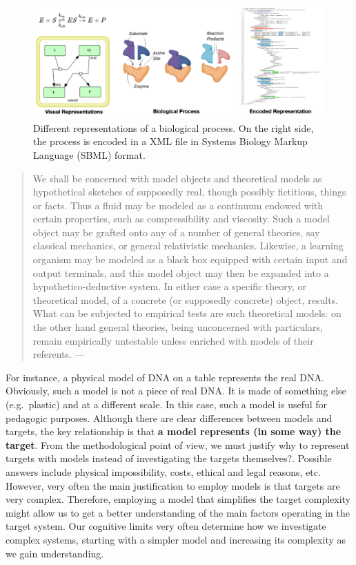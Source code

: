 \documentclass[
]{book}
\begin{document}
\begin{figure}

{\centering \includegraphics[width=1\linewidth]{Figures/sbml_model} 

}

\caption{Different representations of a biological process. On the right side, the process is encoded in a XML file in Systems Biology Markup Language (SBML) format. }\label{fig:sbml-model}
\end{figure}

\begin{quote}
We shall be concerned with model objects and theoretical models as hypothetical sketches of supposedly real, though possibly fictitious, things or facts. Thus a fluid may be modeled as a continuum endowed with certain properties, such as compressibility and viscosity. Such a model object may be grafted onto any of a number of general theories, say classical mechanics, or general relativistic mechanics. Likewise, a learning organism may be modeled as a black box equipped with certain input and output terminals, and this model object may then be expanded into a hypothetico-deductive system. In either case a specific theory, or theoretical model, of a concrete (or supposedly concrete) object, results. What can be subjected to empirical tests are such theoretical models: on the other hand general theories, being unconcerned with particulars, remain empirically untestable unless enriched with models of their referents. --- \citep{bunge2012method}
\end{quote}

For instance, a physical model of DNA on a table represents the real DNA. Obviously, such a model is not a piece of real DNA. It is made of something else (e.g.~plastic) and at a different scale. In this case, such a model is useful for pedagogic purposes. Although there are clear differences between models and targets, the key relationship is that \textbf{a model represents (in some way) the target}. From the methodological point of view, we must justify why to represent targets with models instead of investigating the targets themselves?. Possible answers include physical impossibility, costs, ethical and legal reasons, etc. However, very often the main justification to employ models is that targets are very complex. Therefore, employing a model that simplifies the target complexity might allow us to get a better understanding of the main factors operating in the target system. Our cognitive limits very often determine how we investigate complex systems, starting with a simpler model and increasing its complexity as we gain understanding.
\end{document}
